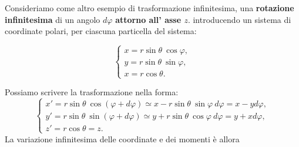 \documentclass[a4paper,12pt,oneside]{book}
\begin{document}
Consideriamo come altro esempio di trasformazione infinitesima, una \textbf{rotazione infinitesima} di un angolo $d\varphi$ \textbf{attorno all' asse $z$}. introducendo un sistema di coordinate polari, per ciascuna particella del sistema:
\begin{center}
\begin{minipage}{0.50\textwidth}
\centering
{}
%
%
\end{minipage}
\begin{minipage}[c]{0.4\textwidth}
\centering
\begin{equation}
\begin{cases} 
x= r \sin \theta \ \cos \varphi , \\
y= r \sin \theta \ \sin \varphi  ,\\
x= r \cos \theta .
\end{cases}
\end{equation}
\end{minipage}
\end{center}
Possiamo scrivere la trasformazione nella forma:
	\begin{equation}
		\begin{cases}
			x'= r \sin \theta \ \cos (\varphi + d \varphi ) \simeq x- r \sin \theta \ \sin \varphi \ d \varphi = x-yd\varphi ,\\
			y'= r \sin \theta \ \sin (\varphi + d \varphi ) \simeq y+ r \sin \theta \ \cos \varphi \ d \varphi = y+xd\varphi ,\\
			z' = r\cos \theta = z .
		\end{cases}
	\end{equation}
La variazione infinitesima delle coordinate e dei momenti è allora
\end{document}
